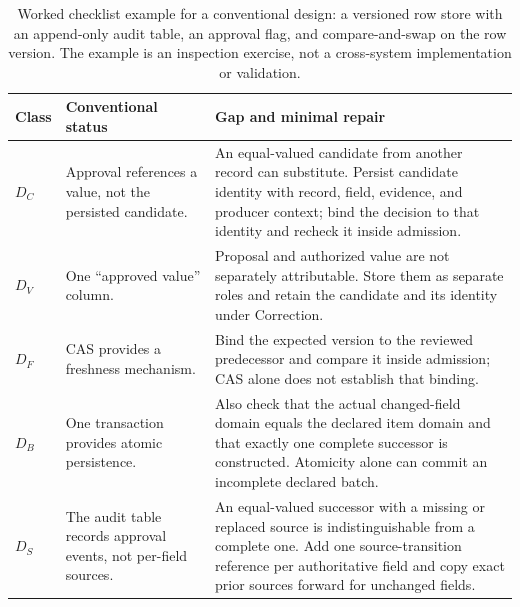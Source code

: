 \begin{table}[t]
\centering
\scriptsize
\setlength{\tabcolsep}{4pt}
\caption{Worked checklist example for a conventional design: a versioned row store with an append-only audit table, an approval flag, and compare-and-swap on the row version. The example is an inspection exercise, not a cross-system implementation or validation.}
\label{tab:design-checklist-example}
\begin{tabularx}{\textwidth}{@{}l>{\raggedright\arraybackslash}p{}>{\raggedright\arraybackslash}X@{}}
\toprule
Class & Conventional status & Gap and minimal repair \\
\midrule
$D_C$ & Approval references a value, not the persisted candidate. & An equal-valued candidate from another record can substitute. Persist candidate identity with record, field, evidence, and producer context; bind the decision to that identity and recheck it inside admission. \\
\addlinespace
$D_V$ & One ``approved value'' column. & Proposal and authorized value are not separately attributable. Store them as separate roles and retain the candidate and its identity under Correction. \\
\addlinespace
$D_F$ & CAS provides a freshness mechanism. & Bind the expected version to the reviewed predecessor and compare it inside admission; CAS alone does not establish that binding. \\
\addlinespace
$D_B$ & One transaction provides atomic persistence. & Also check that the actual changed-field domain equals the declared item domain and that exactly one complete successor is constructed. Atomicity alone can commit an incomplete declared batch. \\
\addlinespace
$D_S$ & The audit table records approval events, not per-field sources. & An equal-valued successor with a missing or replaced source is indistinguishable from a complete one. Add one source-transition reference per authoritative field and copy exact prior sources forward for unchanged fields. \\
\bottomrule
\end{tabularx}
\end{table}
